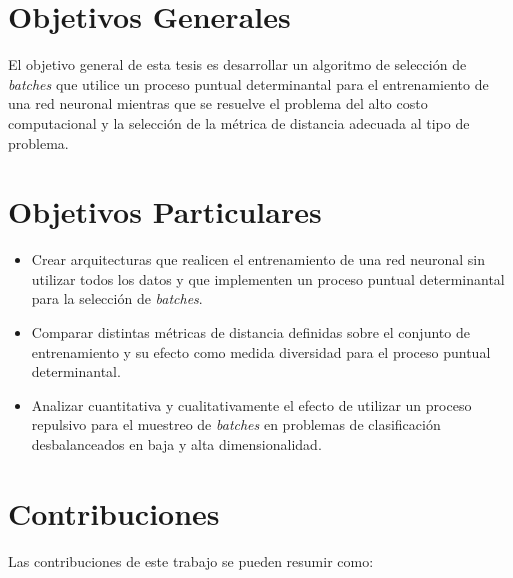 \section{Objetivos Generales}

El objetivo general de esta tesis es desarrollar un algoritmo de selección de \textit{batches} que utilice un proceso puntual determinantal para el entrenamiento de una red neuronal mientras que se resuelve el problema del alto costo computacional y la selección de la métrica de distancia adecuada al tipo de problema.


\section{Objetivos Particulares}

\begin{itemize}
    \item Crear arquitecturas que realicen el entrenamiento de una red neuronal sin utilizar todos los datos y que implementen un proceso puntual determinantal para la selección de \textit{batches}.
    
    \item Comparar distintas métricas de distancia definidas sobre el conjunto de entrenamiento y su efecto como medida diversidad para el proceso puntual determinantal. 

    \item Analizar cuantitativa y cualitativamente el efecto de utilizar un proceso repulsivo para el muestreo de \textit{batches} en problemas de clasificación desbalanceados en baja y alta dimensionalidad. 
    

\end{itemize}



\section{Contribuciones}

Las contribuciones de este trabajo se pueden resumir como: 

